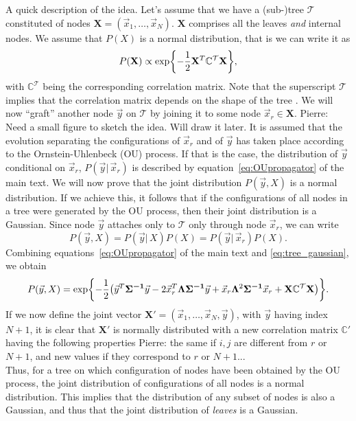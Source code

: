 \documentclass[preprint,amsmath,amssymb,superscriptaddress,showpacs,pre]{revtex4-1}
\let\originalleft\left
\let\originalright\right
\renewcommand{\left}{\mathopen{}\mathclose\bgroup\originalleft}
\renewcommand{\right}{\aftergroup\egroup\originalright}
\def\vx{\vec x}
\newcommand{\Lam}{\bm{\Lambda}}
\newcommand{\pierre}[1]{{\color{red}Pierre: #1}}
\newcommand{\curlynormalpar}[1]{\exp\left\{-\frac{1}{2}\left( #1 \right)\right\}}
\newcommand{\curlynormal}[1]{\exp\left\{-\frac{1}{2} #1 \right\}}
\newcommand{\iSig}{\bm{\Sigma^{-1}}}
\begin{document}
	A quick description of the idea. 
	Let's assume that we have a (sub-)tree $\mathcal{T}$ constituted of nodes $\mathbf{X}=(\vx_1,\ldots,\vx_N)$. $\mathbf{X}$ comprises all the leaves \emph{and} internal nodes. 
	We assume that $P(X)$ is a normal distribution, that is we can write it as 
	\begin{equation}
		P(\mathbf{X}) \propto \curlynormal{\mathbf{X}^{T}\mathbb{C}^{\mathcal{T}}\mathbf{X}},
		\label{eq:tree_gaussian}
	\end{equation}
	with $\mathbb{C}^{\mathcal{T}}$ being the corresponding correlation matrix. 
	Note that the superscript $\mathcal{T}$ implies that the correlation matrix depends on the shape of the tree .
	We will now ``graft'' another node $\vec{y}$ on $\mathcal{T}$ by joining it to some node $\vx_r\in \mathbf{X}$. \pierre{Need a small figure to sketch the idea. Will draw it later.}
	It is assumed that the evolution separating the configurations of $\vx_r$ and of $\vec{y}$ has taken place according to the Ornstein-Uhlenbeck (OU) process.
	If that is the case, the distribution of $\vec{y}$ conditional on $\vx_r$, $P(\vec{y}\vert\,\vx_r)$ is described by equation~\ref{eq:OUpropagator} of the main text. 
	We will now prove that the joint distribution $P(\vec{y},X)$ is a normal distribution. 
	If we achieve this, it follows that if the configurations of all nodes in a tree were generated by the OU process, then their joint distribution is a Gaussian. 
	Since node $\vec{y}$ attaches only to $\mathcal{T}$ only through node $\vx_r$, we can write
	\begin{equation*}
		P(\vec{y},X) = P(\vec{y}\vert\,X)P(X) = P(\vec{y}\vert \,\vx_r)P(X).
	\end{equation*}
	Combining equations~\ref{eq:OUpropagator} of the main text and \ref{eq:tree_gaussian}, we obtain
	\begin{equation}
		P(\vec{y},X) = \curlynormalpar{\vec{y}^{T}\iSig \vec{y} - 2\vx_r^{T}\Lam\iSig\vec{y} + \vx_r\Lam^2\iSig\vx_r + \mathbf{X}\mathbb{C}^{\mathcal{T}}\mathbf{X}}.
	\end{equation}
	If we now define the joint vector $\mathbf{X}'=(\vx_1,\ldots,\vx_N,\vec{y})$, with $\vec{y}$ having index $N+1$, it is clear that $\mathbf{X}'$ is normally distributed with a new correlation matrix $\mathbb{C}'$ having the following properties \pierre{the same if $i,j$ are different from $r$ or $N+1$, and new values if they correspond to $r$ or $N+1$}... \\
	Thus, for a tree on which configuration of nodes have been obtained by the OU process, the joint distribution of configurations of all nodes is a normal distribution. 
	This implies that the distribution of any subset of nodes is also a Gaussian, and thus that the joint distribution of \emph{leaves} is a Gaussian.


\end{document}
